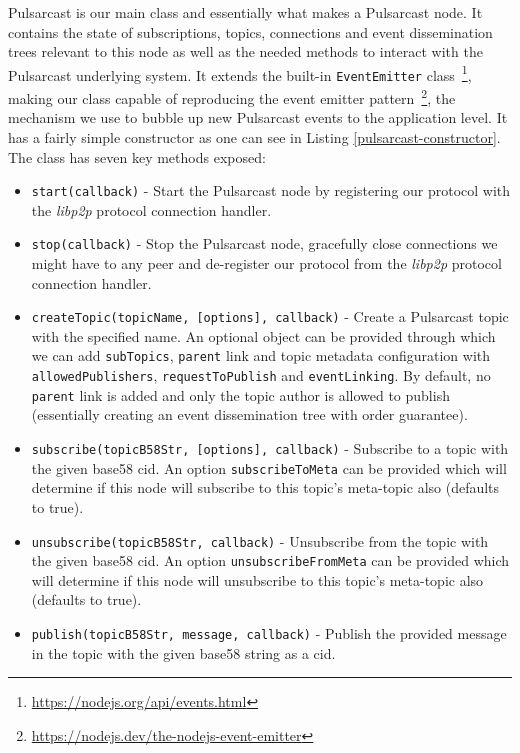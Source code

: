 Pulsarcast is our main class and essentially what makes a Pulsarcast node. It
contains the state of subscriptions, topics, connections and event
dissemination trees relevant to this node as well as the needed methods to
interact with the Pulsarcast underlying system. It extends the built-in
\verb|EventEmitter| class~\footnote{\url{https://nodejs.org/api/events.html}},
making our class capable of reproducing the event emitter
pattern~\footnote{\url{https://nodejs.dev/the-nodejs-event-emitter}}, the
mechanism we use to bubble up new Pulsarcast events to the application level.
It has a fairly simple constructor as one can see in Listing
\ref{pulsarcast-constructor}. The class has seven key methods exposed:

\begin{itemize}
  \item
    \verb|start(callback)| -  Start the Pulsarcast node by registering our protocol with the \emph{libp2p} protocol connection handler.
  \item
    \verb|stop(callback)| - Stop the Pulsarcast node, gracefully close connections we might have to any peer and de-register our protocol from the \emph{libp2p} protocol connection handler.
  \item
  \verb|createTopic(topicName, [options], callback)| - Create a Pulsarcast topic with the specified name. An optional object can be provided through which we can add \verb|subTopics|, \verb|parent| link and topic metadata configuration with \verb|allowedPublishers|, \verb|requestToPublish| and \verb|eventLinking|. By default, no \verb|parent| link is added and only the topic author is allowed to publish (essentially creating an event dissemination tree with order guarantee).
  \item
    \verb|subscribe(topicB58Str, [options], callback)| - Subscribe to a topic with the given base58 \acrshort{cid}. An option \verb|subscribeToMeta| can be provided which will determine if this node will subscribe to this topic's meta-topic also (defaults to true).
  \item
    \verb|unsubscribe(topicB58Str, callback)| - Unsubscribe from the topic with the given base58 \acrshort{cid}. An option \verb|unsubscribeFromMeta| can be provided which will determine if this node will unsubscribe to this topic's meta-topic also (defaults to true).
  \item
    \verb|publish(topicB58Str, message, callback)| - Publish the provided message in the topic with the given base58 string as a \acrshort{cid}.
\end{itemize}

